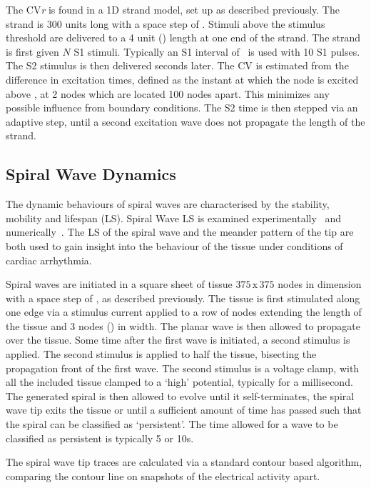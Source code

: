 The CV\emph{r} is found in a 1D strand model, set up as described previously.
The strand is 300 units long with a space step of .
Stimuli above the stimulus threshold are delivered to a 4 unit () length
at one end of the strand.
The strand is first given $N$ S1 stimuli.
Typically an S1 interval of \ is used with 10 S1 pulses.
The S2 stimulus is then delivered  seconds later.
The CV is estimated from the difference in excitation times, defined as the
instant at which the node is excited above , at 2 nodes which are
located 100 nodes apart.
This minimizes any possible influence from boundary conditions.
The S2 time is then stepped via an adaptive step, until a second excitation wave
does not propagate the length of the strand.


\subsection{Spiral Wave Dynamics}

The dynamic behaviours of spiral waves are characterised by the stability,
mobility and lifespan (LS).
Spiral Wave LS is examined experimentally~\cite{Kumagai1997} and
numerically~\cite{Qu2000,Nygren2001,Cherry2007,Clayton2005,Zhang2003}.
The LS of the spiral wave and the meander pattern of the tip are both used to
gain insight into the behaviour of the tissue under conditions of cardiac
arrhythmia.

Spiral waves are initiated in a square sheet of tissue $375\,\text{x}\,375$
nodes in dimension with a space step of , as described previously.  The
tissue is first stimulated along one edge via a stimulus current applied to a
row of nodes extending the length of the tissue and 3 nodes () in width.
The planar wave is then allowed to propagate over the tissue.  Some time after
the first wave is initiated, a second stimulus is applied.  The second stimulus
is applied to half the tissue, bisecting the propagation front of the first wave.
The second stimulus is a voltage clamp, with all the included tissue clamped to
a `high' potential, typically  for a millisecond.  The
generated spiral is then allowed to evolve until it self-terminates, the spiral
wave tip exits the tissue or until a sufficient amount of time has passed such
that the spiral can be classified as `persistent'.  The time allowed for a wave
to be classified as persistent is typically 5 or \unit{10}{s}.

The spiral wave tip traces are calculated via a standard contour based
algorithm, comparing the  contour line on snapshots of the electrical
activity  apart.

